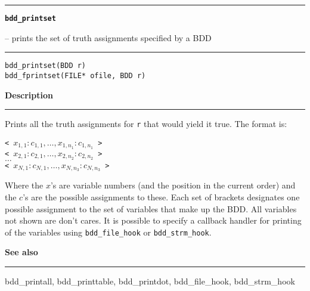 \begin{minipage}{\textwidth}

\noindent\begin{minipage}{\textwidth}
\rule{\textwidth}{0.5mm}
{\tt\bf bdd\_printset }
\--- prints the set of truth assignments specified by a BDD  \hspace{\fill}
\\\rule[1.5ex]{\textwidth}{0.5mm}
\end{minipage}

\noindent\begin{verbatim}
bdd_printset(BDD r)
bdd_fprintset(FILE* ofile, BDD r) 
\end{verbatim}

\vspace{\parsep}\noindent
{\bf Description}\\\rule[1.5ex]{\textwidth}{0.2mm}\vspace{-1.5ex}\setlength{\parindent}{1em}
Prints all the truth assignments for {\tt r} that would yield
           it true. The format is:
	   \begin{Ill}
	     {\tt < $x_{1,1}:c_{1,1},\ldots,x_{1,n_1}:c_{1,n_1}$ >\\
	          < $x_{2,1}:c_{2,1},\ldots,x_{2,n_2}:c_{2,n_2}$ >\\
		  $\ldots$ \\
	          < $x_{N,1}:c_{N,1},\ldots,x_{N,n_3}:c_{N,n_3}$ > }
	   \end{Ill} 
	   Where the $x$'s are variable numbers (and the position in the
	   current order) and the $c$'s are the
	   possible assignments to these. Each set of brackets designates
	   one possible assignment to the set of variables that make up the
	   BDD. All variables not shown are don't cares. It is possible to
	   specify a callback handler for printing of the variables using
	   {\tt bdd\_file\_hook} or {\tt bdd\_strm\_hook}. 

\vspace{\parsep}\vspace{\baselineskip}\noindent
{\bf See also}\\\rule[1.5ex]{\textwidth}{0.2mm}\vspace{-1.5ex}
bdd\_printall, bdd\_printtable, bdd\_printdot, bdd\_file\_hook, bdd\_strm\_hook 
\end{minipage}
\vspace{8ex}
